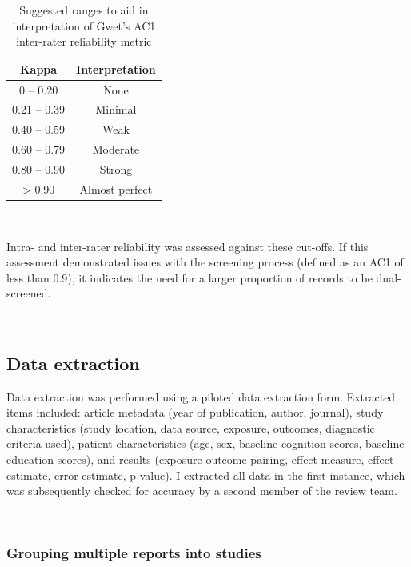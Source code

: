 \documentclass[a4paper, twoside]{templates/ociamthesis}
\begin{document}
\begin{table}[H]

\caption[Ranges for Gwet's AC1]{\label{tab:gwet-table}Suggested ranges to aid in interpretation of Gwet's AC1 inter-rater reliability metric}
\centering
\begin{tabular}[t]{cc}
\toprule
\textbf{Kappa} & \textbf{Interpretation}\\
\midrule
0    – 0.20 & None\\
\midrule
0.21 – 0.39 & Minimal\\
\midrule
0.40 – 0.59 & Weak\\
\midrule
0.60 – 0.79 & Moderate\\
\midrule
0.80 – 0.90 & Strong\\
\midrule
\addlinespace
> 0.90 & Almost perfect\\
\bottomrule
\end{tabular}
\end{table}

~

Intra- and inter-rater reliability was assessed against these cut-offs. If this assessment demonstrated issues with the screening process (defined as an AC1 of less than 0.9), it indicates the need for a larger proportion of records to be dual-screened.

~

\hypertarget{data-extraction}{%
\subsection{Data extraction}\label{data-extraction}}

Data extraction was performed using a piloted data extraction form. Extracted items included: article metadata (year of publication, author, journal), study characteristics (study location, data source, exposure, outcomes, diagnostic criteria used), patient characteristics (age, sex, baseline cognition scores, baseline education scores), and results (exposure-outcome pairing, effect measure, effect estimate, error estimate, p-value). I extracted all data in the first instance, which was subsequently checked for accuracy by a second member of the review team.

~

\hypertarget{grouping-multiple-reports-into-studies}{%
\subsubsection{Grouping multiple reports into studies}\label{grouping-multiple-reports-into-studies}}
\end{document}
